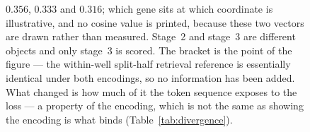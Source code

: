 \begin{figure}[htbp]
\begin{fullwidth}
{$0.356$, $0.333$ and $0.316$; which gene sits at which coordinate is
illustrative, and no cosine value is printed, because these two vectors are
drawn rather than measured. Stage~2 and stage~3 are different objects and only
stage~3 is scored. The bracket is the point of the figure --- the within-well
split-half retrieval reference is essentially identical under both encodings, so
no information has been added. What changed is how much of it the token sequence
exposes to the loss --- a property of the encoding, which is not the same as
showing the encoding is what binds (Table~\ref{tab:divergence}).}
\label{fig:frame}
\end{fullwidth}
\end{figure}
